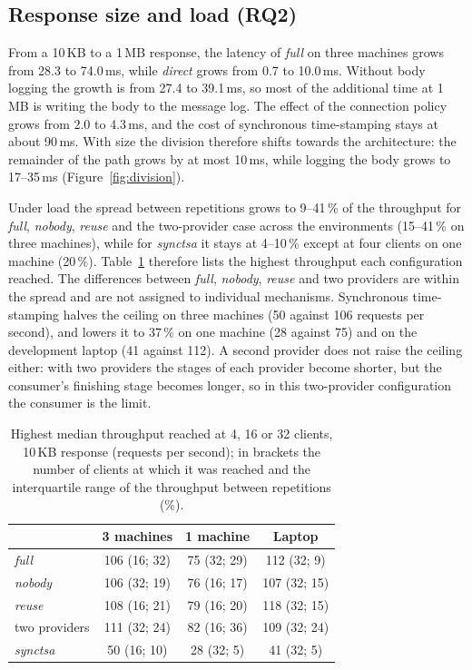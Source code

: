 \documentclass[conference,a4paper]{IEEEtran}
\newcommand{\newtext}[1]{{\color{blue}#1}}
\begin{document}
\subsection{Response size and load (RQ2)}

From a 10\,KB to a 1\,MB response, the latency of \emph{full} on three machines grows from 28.3 to
74.0\,ms, while \emph{direct} grows from 0.7 to 10.0\,ms. Without body logging the growth is from 27.4
to 39.1\,ms, so most of the additional time at 1\,MB is writing the body to the message log. The
effect of the connection policy grows from 2.0 to 4.3\,ms, and the cost of synchronous time-stamping
stays at about 90\,ms. \newtext{With size the division therefore shifts towards the architecture: the
remainder of the path grows by at most 10\,ms, while logging the body grows to 17--35\,ms
(\newtext{Figure~\ref{fig:division}}).}

Under load the spread between repetitions grows to 9--41\,\% of the throughput for \emph{full},
\emph{nobody}, \emph{reuse} and the two-provider case across the environments (15--41\,\% on three
machines), while for \emph{synctsa} it stays at 4--10\,\% except at four clients on one machine
(20\,\%).
Table~\ref{tab:load} therefore lists the highest throughput each configuration reached. The
differences between \emph{full}, \emph{nobody}, \emph{reuse} and two providers are within the spread
and are not assigned to individual mechanisms. Synchronous time-stamping halves the ceiling on three
machines (50 against 106 requests per second)\newtext{, and lowers it to 37\,\% on one machine (28 against 75) and on the development laptop (41 against 112)}. A second provider does not raise the ceiling either:
with two providers the stages of each provider become shorter, but the consumer's finishing stage
becomes longer, so \newtext{in this two-provider configuration} the consumer is the limit.

\begin{table}[!htb]
\centering\footnotesize
\setlength{\tabcolsep}{4pt}
\caption{Highest median throughput reached at 4, 16 or 32 clients, 10\,KB response (requests per
second); in brackets the number of clients at which it was reached and the interquartile range of
the throughput between repetitions (\%).}
\label{tab:load}
\begin{tabular}{@{}lccc@{}}
\toprule
& 3 machines & 1 machine & Laptop \\
\midrule
\emph{full} & 106 (16; 32) & 75 (32; 29) & 112 (32; 9) \\
\emph{nobody} & 106 (32; 19) & 76 (16; 17) & 107 (32; 15) \\
\emph{reuse} & 108 (16; 21) & 79 (16; 20) & 118 (32; 15) \\
two providers & 111 (32; 24) & 82 (16; 36) & 109 (32; 24) \\
\emph{synctsa} & 50 (16; 10) & 28 (32; 5) & 41 (32; 5) \\
\bottomrule
\end{tabular}
\end{table}
\end{document}
